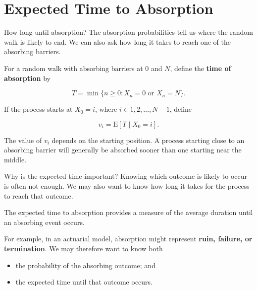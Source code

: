\documentclass[
  ignorenonframetext,
  aspectratio=169,
]{beamer}
\providecommand{\tightlist}{%
  \setlength{\itemsep}{0pt}\setlength{\parskip}{0pt}}
\begin{document}
\section{Expected Time to Absorption}\label{expected-time-to-absorption}

\begin{frame}{How long until absorption?}
\protect{}\label{how-long-until-absorption}
The absorption probabilities tell us where the random walk is likely to
end. We can also ask how long it takes to reach one of the absorbing
barriers.

For a random walk with absorbing barriers at \(0\) and \(N\), define the
\textbf{time of absorption} by

\[
T=\min\{n\geq0:X_n=0\text{ or }X_n=N\}.
\]

If the process starts at \(X_0=i\), where \(i\in{1,2,\ldots,N-1}\),
define

\[
v_i=\mathrm{E}[T\mid X_0=i].
\]

The value of \(v_i\) depends on the starting position. A process
starting close to an absorbing barrier will generally be absorbed sooner
than one starting near the middle.
\end{frame}

\begin{frame}{Why is the expected time important?}
\protect{}\label{why-is-the-expected-time-important}
Knowing which outcome is likely to occur is often not enough. We may
also want to know how long it takes for the process to reach that
outcome.

The expected time to absorption provides a measure of the average
duration until an absorbing event occurs.

For example, in an actuarial model, absorption might represent
\textbf{ruin, failure, or termination}. We may therefore want to know
both

\begin{itemize}
\tightlist
\item
  the probability of the absorbing outcome; and
\item
  the expected time until that outcome occurs.
\end{itemize}
\end{frame}
\end{document}
